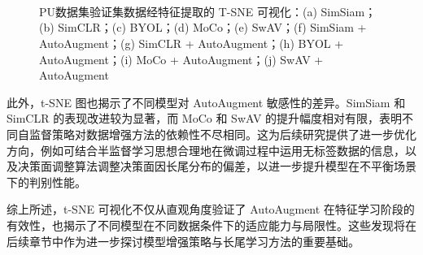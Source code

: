 \documentclass[master]{thesis-uestc}
\begin{document}
\begin{figure}[H]
    \centering
    \\
    \\
    \\
    \caption{PU数据集验证集数据经特征提取的 T-SNE 可视化：(a) SimSiam；(b) SimCLR；(c) BYOL；(d) MoCo；(e) SwAV；(f) SimSiam + AutoAugment；(g) SimCLR + AutoAugment；(h) BYOL + AutoAugment；(i) MoCo + AutoAugment；(j) SwAV + AutoAugment}
    \label{tsne_of_all_models_pu}
\end{figure}

此外，t-SNE 图也揭示了不同模型对 AutoAugment 敏感性的差异。SimSiam 和 SimCLR 的表现改进较为显著，而 MoCo 和 SwAV 的提升幅度相对有限，表明不同自监督策略对数据增强方法的依赖性不尽相同。这为后续研究提供了进一步优化方向，例如可结合半监督学习思想合理地在微调过程中运用无标签数据的信息，以及决策面调整算法调整决策面因长尾分布的偏差，以进一步提升模型在不平衡场景下的判别性能。

综上所述，t-SNE 可视化不仅从直观角度验证了 AutoAugment 在特征学习阶段的有效性，也揭示了不同模型在不同数据条件下的适应能力与局限性。这些发现将在后续章节中作为进一步探讨模型增强策略与长尾学习方法的重要基础。
\FloatBarrier  %
\end{document}

